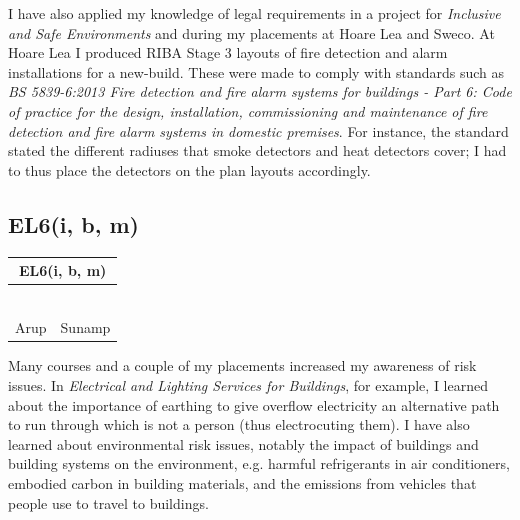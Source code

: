 I have also applied my knowledge of legal requirements in a project for \textit{Inclusive and Safe Environments} and during my placements at Hoare Lea and Sweco.
At Hoare Lea I produced RIBA Stage 3 layouts of fire detection and alarm installations for a new-build.
These were made to comply with standards such as \textit{BS 5839-6:2013 Fire detection and fire alarm systems for buildings - Part 6: Code of practice for the design, installation, commissioning and maintenance of fire detection and fire alarm systems in domestic premises}.
For instance, the standard stated the different radiuses that smoke detectors and heat detectors cover; I had to thus place the detectors on the plan layouts accordingly.







\subsection*{EL6(i, b, m)}

\begin{table}
	\begin{tabular}{|ll|}
		\hline
		\multicolumn{2}{|c|}{\cellcolor[HTML]{F8A102}\textbf{EL6(i, b, m)} \nomaster} \\ \hline
		\ConTechOne & \IE \\
		\ELS & \TPS \\
		\DI & \FMP \\
		\LAB & \ISE \\
		\SIB & \ICP \\
		\CCSA & \WSD \\
		Arup & Sunamp \\ \hline
	\end{tabular}
\end{table}

Many courses and a couple of my placements increased my awareness of risk issues.
In \textit{Electrical and Lighting Services for Buildings}, for example, I learned about the importance of earthing to give overflow electricity an alternative path to run through which is not a person (thus electrocuting them).
I have also learned about environmental risk issues, notably the impact of buildings and building systems on the environment, e.g. harmful refrigerants in air conditioners, embodied carbon in building materials, and the emissions from vehicles that people use to travel to buildings.

